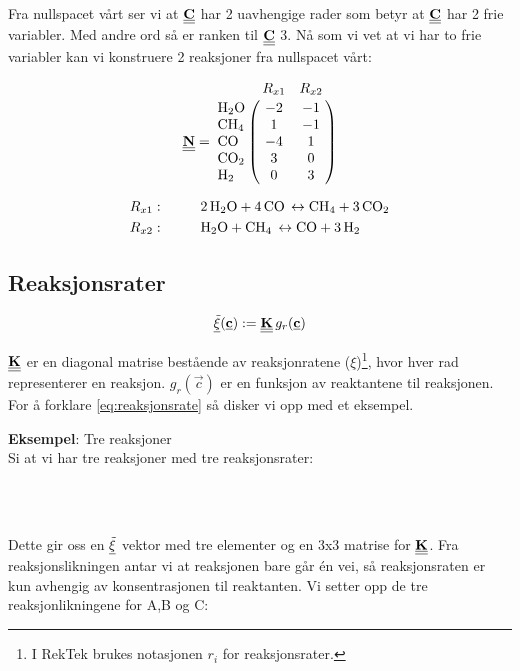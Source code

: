 Fra nullspacet vårt ser vi at $\underline{\underline{\textbf{C}}}$ har 2 uavhengige rader som betyr at $\underline{\underline{\textbf{C}}}$ har 2 frie variabler. Med andre ord så er ranken til $\underline{\underline{\textbf{C}}}$ 3. Nå som vi vet at vi har to frie variabler kan vi konstruere 2 reaksjoner fra nullspacet vårt:

\begin{equation}
    \mymat{N} = 
    \bordermatrix{~ & R_{x1} & R_{x2}   \cr
                  \ce{H2O} & -2 & -1  \cr
                  \ce{CH4} & 1 & -1 \cr
                  \ce{CO} & -4 & 1 \cr
                  \ce{CO2} & 3 & 0 \cr
                  \ce{H2} & 0 & 3
                  }
\end{equation}

\begin{align*}
    R_{x1}:&\hspace{1cm} \ce{2H2O + 4CO \leftrightarrow CH4 + 3CO2} \\
    R_{x2}:&\hspace{1cm} \ce{H2O + CH4 \leftrightarrow CO + 3H2}
\end{align*}


\subsection{Reaksjonsrater}
\begin{equation}
    \label{eq:reaksjonsrate}
    \underline{\Tilde{\xi}}(\underline{\textbf{c}}) := \underline{\underline{\textbf{K}}}\,g_r(\underline{\textbf{c}})
\end{equation}

$\underline{\underline{\textbf{K}}}$ er en diagonal matrise bestående av reaksjonratene ($\xi$)\footnote{I RekTek brukes notasjonen $r_i$ for reaksjonsrater.}, hvor hver rad representerer en reaksjon. $g_r(\vec{c})$ er en funksjon av reaktantene til reaksjonen. For å forklare \cref{eq:reaksjonsrate} så disker vi opp med et eksempel. 

\textbf{Eksempel}: Tre reaksjoner\\
Si at vi har tre reaksjoner med tre reaksjonsrater:
\begin{center}
    \\
    \\
\end{center}

Dette gir oss en $\underline{\Tilde{\xi}}$ vektor med tre elementer og en 3x3 matrise for $\underline{\underline{\textbf{K}}}$. Fra reaksjonslikningen antar vi at reaksjonen bare går én vei, så reaksjonsraten er kun avhengig av konsentrasjonen til reaktanten. Vi setter opp de tre reaksjonlikningene for A,B og C:

